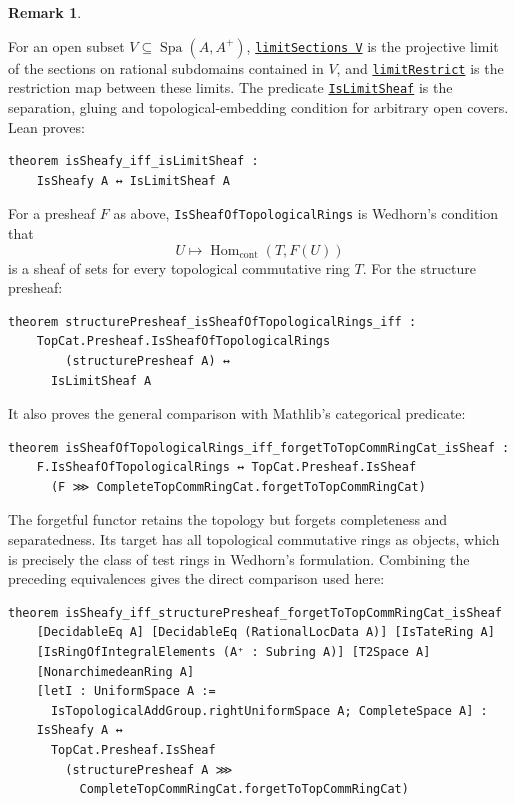 \documentclass[11pt,reqno]{amsart}
\theoremstyle{definition}
\newtheorem{remark}[remark]{Remark}
\newcommand{\Spa}{\operatorname{Spa}}
\begin{document}
\begin{remark}
\label{rem:lean-sheaf-comparison}
\par
For an open subset \(V\subseteq\Spa(A,A^+)\),
\href{https://cbirkbeck.github.io/uniform-sheafy-tate-domains/lean/AdicSpaces/declarations/ValuationSpectrum.limitSections.html}{\texttt{limitSections V}}
is the projective limit of the sections on rational subdomains contained in
\(V\), and
\href{https://cbirkbeck.github.io/uniform-sheafy-tate-domains/lean/AdicSpaces/declarations/ValuationSpectrum.limitRestrict.html}{\texttt{limitRestrict}}
is the restriction map between these limits.  The predicate
\href{https://cbirkbeck.github.io/uniform-sheafy-tate-domains/lean/AdicSpaces/declarations/ValuationSpectrum.IsLimitSheaf.html}{\texttt{IsLimitSheaf}}
is the separation, gluing and topological-embedding condition for arbitrary
open covers.  Lean proves:

\begin{lstlisting}
theorem isSheafy_iff_isLimitSheaf :
    IsSheafy A ↔ IsLimitSheaf A
\end{lstlisting}

For a presheaf \(F\) as above, \texttt{IsSheafOfTopologicalRings} is Wedhorn's
condition that
\[
  U\longmapsto\operatorname{Hom}_{\mathrm{cont}}(T,F(U))
\]
is a sheaf of sets for every topological commutative ring \(T\).  For the
structure presheaf:

\begin{lstlisting}
theorem structurePresheaf_isSheafOfTopologicalRings_iff :
    TopCat.Presheaf.IsSheafOfTopologicalRings
        (structurePresheaf A) ↔
      IsLimitSheaf A
\end{lstlisting}

It also proves the general comparison with Mathlib's categorical predicate:

\begin{lstlisting}
theorem isSheafOfTopologicalRings_iff_forgetToTopCommRingCat_isSheaf :
    F.IsSheafOfTopologicalRings ↔ TopCat.Presheaf.IsSheaf
      (F ⋙ CompleteTopCommRingCat.forgetToTopCommRingCat)
\end{lstlisting}

The forgetful functor retains the topology but forgets completeness and
separatedness.  Its target has all topological commutative rings as objects,
which is precisely the class of test rings in Wedhorn's formulation.  Combining
the preceding equivalences gives the direct comparison used here:

\begin{lstlisting}
theorem isSheafy_iff_structurePresheaf_forgetToTopCommRingCat_isSheaf
    [DecidableEq A] [DecidableEq (RationalLocData A)] [IsTateRing A]
    [IsRingOfIntegralElements (A⁺ : Subring A)] [T2Space A]
    [NonarchimedeanRing A]
    [letI : UniformSpace A :=
      IsTopologicalAddGroup.rightUniformSpace A; CompleteSpace A] :
    IsSheafy A ↔
      TopCat.Presheaf.IsSheaf
        (structurePresheaf A ⋙
          CompleteTopCommRingCat.forgetToTopCommRingCat)
\end{lstlisting}


\end{remark}
\end{document}
